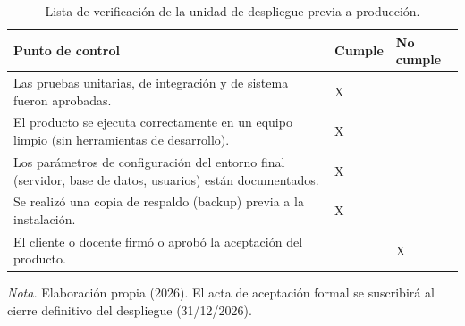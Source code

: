 \begin{table}[H]
  \centering
  \small
  \caption{Lista de verificación de la unidad de despliegue previa a producción.}
  \label{tab:despliegue_check_unidad}
  \begin{tabularx}{\linewidth}{|>{\raggedright\arraybackslash}X|>{\centering\arraybackslash}p{1.8cm}|>{\centering\arraybackslash}p{1.8cm}|}
    \hline
    \textbf{Punto de control} & \textbf{Cumple} & \textbf{No cumple} \\ \hline
    Las pruebas unitarias, de integración y de sistema fueron aprobadas. & X & \\ \hline
    El producto se ejecuta correctamente en un equipo limpio (sin herramientas de desarrollo). & X & \\ \hline
    Los parámetros de configuración del entorno final (servidor, base de datos, usuarios) están documentados. & X & \\ \hline
    Se realizó una copia de respaldo (backup) previa a la instalación. & X & \\ \hline
    El cliente o docente firmó o aprobó la aceptación del producto. & & X \\ \hline
  \end{tabularx}
  \par\vspace{0.2cm}
  {\raggedright \small \emph{Nota.} Elaboración propia (2026). El acta de aceptación formal se suscribirá al cierre definitivo del despliegue (31/12/2026).\par}
\end{table}
